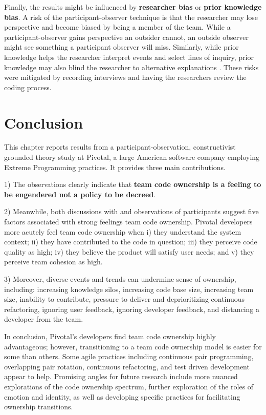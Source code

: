 Finally, the results might be influenced by \textbf{researcher bias} or \textbf{prior knowledge bias}. A risk of the participant-observer technique is that the researcher may lose perspective and become biased by being a member of the team. While a participant-observer gains perspective an outsider cannot, an outside observer might see something a participant observer will miss. Similarly, while prior knowledge helps the researcher interpret events and select lines of inquiry, prior knowledge may also blind the researcher to alternative explanations \cite{GlaserIssues}. These risks were mitigated by recording interviews and having the researchers review the coding process. 

\section{Conclusion}
\label{TeamCodeOwnershipConclusion}
This chapter reports results from a participant-observation, constructivist grounded theory study at Pivotal, a large American software company employing Extreme Programming practices. It provides three main contributions.

1) The observations clearly indicate that \textbf{team code ownership is a feeling to be engendered not a policy to be decreed}.

2) Meanwhile, both discussions with and observations of participants suggest five factors associated with strong feelings team code ownership. Pivotal developers more acutely feel team code ownership when i) they understand the system context; ii) they have contributed to the code in question; iii) they perceive code quality as high; iv) they believe the product will satisfy user needs; and v) they perceive team cohesion as high.   

3) Moreover, diverse events and trends can undermine sense of ownership, including:  increasing knowledge silos, increasing code base size, increasing team size, inability to contribute, pressure to deliver and deprioritizing continuous refactoring, ignoring user feedback, ignoring developer feedback, and distancing a developer from the team. 

In conclusion, Pivotal's developers find team code ownership highly advantageous; however, transitioning to a team code ownership model is easier for some than others. Some agile practices including continuous pair programming, overlapping pair rotation, continuous refactoring, and test driven development appear to help. Promising angles for future research include more nuanced explorations of the code ownership spectrum, further exploration of the roles of emotion and identity, as well as developing specific practices for facilitating ownership transitions. 


